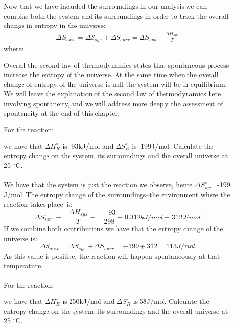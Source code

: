 \documentclass[main.tex]{subfiles}
\newcommand\chapterlabel{entropy}
\begin{document}
\begin{description}
\item[] 
Now that we have included the surroundings in our analysis we can combine both the system and its surroundings in order to track the overall change in entropy in the universe:
\begin{equation}\begin{split}
\boxed{  \Delta S_{univ}=\Delta S_{sys}+ \Delta S_{surr}=\Delta S_{sys} -\frac{\Delta H_{sys}}{T}    }
\label{\chapterlabel:equation5}
\end{split}\end{equation}
where:
Overall the second law of thermodynamics states that spontaneous process increase the entropy of the universe. At the same time when the overall change of entropy of the universe is null the system will be in equilibrium. We will leave the explanation of the second law of thermodynamics here, involving spontaneity, and we will address more deeply the assessment of spontaneity at the end of this chapter.
\begin{example} %
For the reaction:
\begin{center}\end{center}
we have that $\Delta H_{R}^{\circ}$ is -93kJ/mol and $\Delta S_{R}^{\circ}$ is -199J/mol. Calculate the entropy change on the system, its surroundings and the overall universe at 25 $^{\circ}$C.\\
\\
We have that the system is just the reaction we observe, hence $\Delta S_{sys}^{\circ}$=-199 J/mol. The entropy change of the surroundings--the environment where the reaction takes place--is:
\[ \Delta S_{surr}=-\frac{\Delta H_{sys}}{T}   =-\frac{-93}{298}=0.312kJ/mol=312J/mol\]
If we combine both contributions we have that the entropy change of the universe is:
\[ \Delta S_{univ}=\Delta S_{sys}+ \Delta S_{surr}= -199+312=113J/mol	\]
As this value is positive, the reaction will happen spontaneously at that temperature.
\\
\faDiamond\ \\
For the reaction:
\begin{center}\end{center}
we have that $\Delta H_{R}^{\circ}$ is 250kJ/mol and $\Delta S_{R}^{\circ}$ is 58J/mol. Calculate the entropy change on the system, its surroundings and the overall universe at 25 $^{\circ}$C.\\


\end{example}
\end{description}
\end{document}

